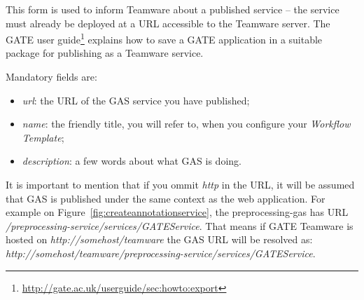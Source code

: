 This form is used to inform Teamware about a published service -- the service
must already be deployed at a URL accessible to the Teamware server.  The GATE
user guide\footnote{\url{http://gate.ac.uk/userguide/sec:howto:export}}
explains how to save a GATE application in a suitable package for publishing as
a Teamware service.
%
%

Mandatory fields are:
\begin{itemize}
  \item \emph{url}: the URL of the GAS service you have published;
  \item \emph{name}: the friendly title, you will refer to, when you
configure your \emph{Workflow Template};
  \item \emph{description}: a few words about what GAS is doing.
\end{itemize}

It is important to mention that if you ommit \emph{http} in the
URL, it will be assumed that GAS is published under the same context as the web
application.
For example on Figure~\ref{fig:createannotationservice}, the preprocessing-gas
has URL
\emph{/preprocessing-service/services/GATEService}. That means if GATE Teamware
is hosted on
\emph{http://somehost/teamware} the GAS URL will be resolved as:
\emph{
http://somehost/teamware/preprocessing-service/services/GATEService}.


